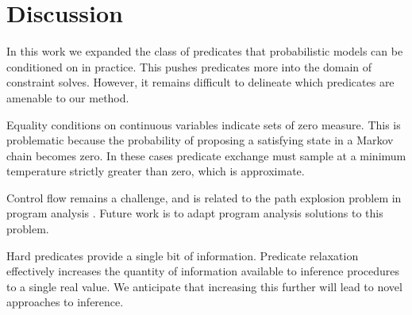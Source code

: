 \section{Discussion}
In this work we expanded the class of predicates that probabilistic models can be conditioned on in practice.
This pushes predicates more into the domain of constraint solves.
However, it remains difficult to delineate which predicates are amenable to our method.

Equality conditions on continuous variables indicate sets of zero measure.
This is problematic because the probability of proposing a satisfying state in a Markov chain becomes zero.
In these cases predicate exchange must sample at a minimum temperature strictly greater than zero, which is approximate.

Control flow remains a challenge, and is related to the path explosion problem in program analysis \cite{cadar2008exe, sen2005cute}.
Future work is to adapt program analysis solutions to this problem.


Hard predicates provide a single bit of information.
Predicate relaxation effectively increases the quantity of information available to inference procedures to a single real value.
We anticipate that increasing this further will lead to novel approaches to inference.




